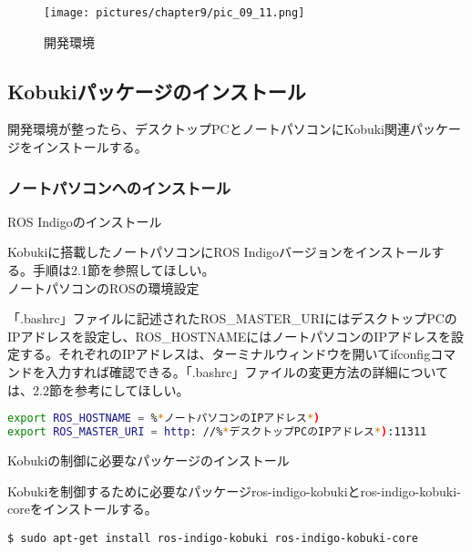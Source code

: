 \begin{itemize}
\begin{figure}[htp]
  \centering
  \texttt{[image: pictures/chapter9/pic\_09\_11.png]}
  \caption{開発環境}
\end{figure}

\subsection{Kobukiパッケージのインストール}

開発環境が整ったら、デスクトップPCとノートパソコンにKobuki関連パッケージをインストールする。

\subsubsection{ノートパソコンへのインストール}

\setcounter{num}{0}

\circled{\thenum} ROS Indigoのインストール

Kobukiに搭載したノートパソコンにROS Indigoバージョンをインストールする。手順は2.1節を参照してほしい。\\

\circled{\thenum} ノートパソコンのROSの環境設定

「.bashrc」ファイルに記述されたROS\_MASTER\_URIにはデスクトップPCのIPアドレスを設定し、ROS\_HOSTNAMEにはノートパソコンのIPアドレスを設定する。それぞれのIPアドレスは、ターミナルウィンドウを開いてifconfigコマンドを入力すれば確認できる。「.bashrc」ファイルの変更方法の詳細については、2.2節を参考にしてほしい。\\

\begin{lstlisting}[language=bash]
export ROS_HOSTNAME = %*ノートパソコンのIPアドレス*)
export ROS_MASTER_URI = http: //%*デスクトップPCのIPアドレス*):11311
\end{lstlisting}

\circled{\thenum} Kobukiの制御に必要なパッケージのインストール

Kobukiを制御するために必要なパッケージros-indigo-kobukiとros-indigo-kobuki-coreをインストールする。\\

\begin{lstlisting}[language=ROS]
$ sudo apt-get install ros-indigo-kobuki ros-indigo-kobuki-core
\end{lstlisting}


\end{itemize}
